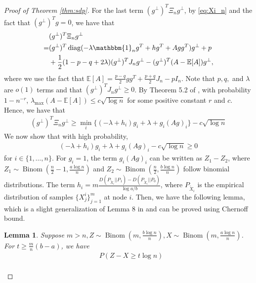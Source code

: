\documentclass[conference]{IEEEtran}
\newtheorem{lemma}{Lemma}
\DeclareMathOperator{\diag}{diag}
\DeclareMathOperator{\Binom}{Binom}
\begin{document}
\begin{proof}[Proof of Theorem \ref{thm:sdp}]
 
	
	
	
	
	
	
	For the last term $(g^{\perp})^T \Xi_n g^{\perp}$, by \eqref{eq:Xi_n} and the fact that $(g^{\perp})^Tg=0$, we have that
	\begin{align*}
		&(g^{\perp})^T \Xi_n g^{\perp} \\
		=& (g^{\perp})^T \diag( -\lambda \mathbbm{1}_ng^T+hg^T + Agg^T) g^{\perp} + p \\
		&+ \frac{1}{2}(1-p-q+2\lambda)(g^{\perp})^TJ_n g^{\perp}
		-(g^{\perp})^T(A-\mathbb{E}[A])g^{\perp},
	\end{align*}
	where we use the fact that $\mathbb{E}[A] = \frac{p-q}{2}gg^T + \frac{p+q}{2}J_n - pI_n$. Note that $p,q,$ and $\lambda$ are $o(1)$ terms and that $(g^{\perp})^TJ_n g^{\perp}\ge 0$. 
	By Theorem 5.2 of \cite{lei2015consistency},
	with probability $1-n^{-r}$, $\lambda_{\max}(A-\mathbb{E}[A]) \leq c\sqrt{\log n}$ for some positive constant $r$ and $c$. Hence, we have that
	\begin{align}\label{eq:lastterm}
		(g^{\perp})^T \Xi_n g^{\perp} \geq \min_i\{(-\lambda + h_i) g_i+\lambda + g_i (Ag)_i \} - c \sqrt{\log n}
	\end{align}
	We now show that with high probability,
	\begin{align}\label{eq:nodei}
		(-\lambda + h_i) g_i+\lambda + g_i (Ag)_i  - c \sqrt{\log n}\ge 0
	\end{align}
	for $i\in\{1,\ldots,n\}$. For $g_i=1$,
	the term $g_i(Ag)_i$ can be written as 
	$Z_1-Z_2$, where $Z_1\sim \Binom(\frac{n}{2}-1,\frac{a\log n}{n})$
	and $Z_2\sim \Binom(\frac{n}{2},\frac{b\log n}{n})$ 
	follow binomial distributions. The term $h_i=m \frac{D(P_{\widetilde{X}_i} || P_1) - D(P_{\widetilde{X}_i} || P_0) }{\log a /b}$, where $P_{\widetilde{X}_i}$ is the empirical distribution of samples $\{X^i_j\}^m_{j=1}$ at node $i$. Then, we have the following lemma, which is a slight generalization of Lemma 8 in \cite{abbe2015exact} and can be proved using Chernoff bound.
	\begin{lemma}\label{lem:zxt}
		Suppose $m > n, Z \sim \Binom(m, \frac{b\log n}{n}), X\sim \Binom(m, \frac{a\log n}{n})$.
		For $ t \geq \frac{m}{n}(b - a)$, we have
		\begin{align}\label{eq:estimation}
			&P(Z - X \geq t \log n) \nonumber\\

\end{align}
\end{lemma}
\end{proof}
\end{document}
